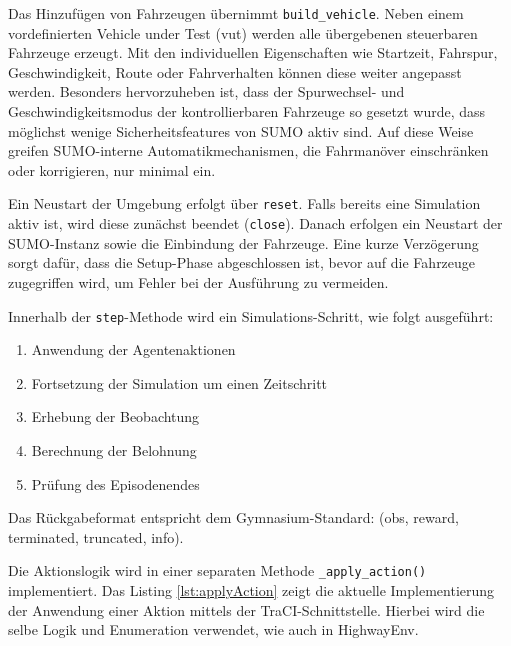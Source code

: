 Das Hinzufügen von Fahrzeugen übernimmt \texttt{build\_vehicle}. Neben einem vordefinierten Vehicle under Test (vut) werden alle übergebenen steuerbaren Fahrzeuge erzeugt. Mit den individuellen Eigenschaften wie Startzeit, Fahrspur, Geschwindigkeit, Route oder Fahrverhalten können diese weiter angepasst werden. Besonders hervorzuheben ist, dass der Spurwechsel- und Geschwindigkeitsmodus der kontrollierbaren Fahrzeuge so gesetzt wurde, dass möglichst wenige Sicherheitsfeatures von SUMO aktiv sind. Auf diese Weise greifen SUMO-interne Automatikmechanismen, die Fahrmanöver einschränken oder korrigieren, nur minimal ein. 

Ein Neustart der Umgebung erfolgt über \texttt{reset}. Falls bereits eine Simulation aktiv ist, wird diese zunächst beendet (\texttt{close}). Danach erfolgen ein Neustart der SUMO-Instanz sowie die Einbindung der Fahrzeuge. Eine kurze Verzögerung sorgt dafür, dass die Setup-Phase abgeschlossen ist, bevor auf die Fahrzeuge zugegriffen wird, um Fehler bei der Ausführung zu vermeiden.

Innerhalb der \texttt{step}-Methode wird ein Simulations-Schritt, wie folgt ausgeführt:
\begin{enumerate}
    \item Anwendung der Agentenaktionen
    \item Fortsetzung der Simulation um einen Zeitschritt
    \item Erhebung der Beobachtung
    \item Berechnung der Belohnung
    \item Prüfung des Episodenendes
\end{enumerate}
Das Rückgabeformat entspricht dem Gymnasium-Standard: (obs, reward, terminated, truncated, info).

Die Aktionslogik wird in einer separaten Methode \texttt{\_apply\_action()} implementiert. Das Listing \ref{lst:applyAction} zeigt die aktuelle Implementierung der Anwendung einer Aktion mittels der TraCI-Schnittstelle. Hierbei wird die selbe Logik und Enumeration verwendet, wie auch in HighwayEnv.

